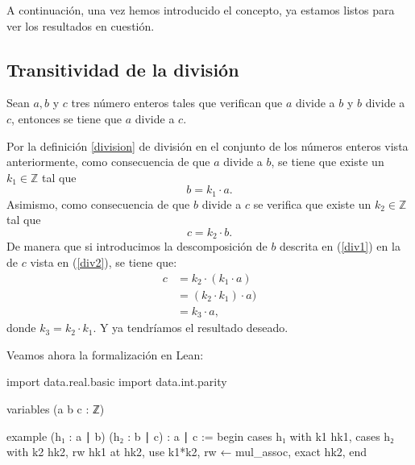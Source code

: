 A continuación, una vez hemos introducido el concepto, ya estamos listos
para ver los resultados en cuestión.

\subsection{Transitividad de la división}

\begin{teorema}
  Sean \(a, b\) y \(c\) tres número enteros tales que verifican que
  \(a\) divide a \(b\) y \(b\) divide a \(c\), entonces se tiene que
  \(a\) divide a \(c\).
\end{teorema}

\begin{demostracion}
  Por la definición \ref{division} de división en el conjunto de los
  números enteros vista anteriormente, como consecuencia de que \(a\)
  divide a \(b\), se tiene que existe un \(k_1 ∈ ℤ\) tal que
  \begin{equation}\label{div1}
    b = k_1 · a.
  \end{equation}
  Asimismo, como consecuencia de que \(b\) divide a \(c\) se verifica
  que existe un \(k_2 ∈ ℤ\) tal que
  \begin{equation}\label{div2}
    c = k_2 · b.
  \end{equation}
  De manera que si introducimos la descomposición de \(b\) descrita en
  (\ref{div1}) en la de \(c\) vista en (\ref{div2}), se tiene que:
  \[\begin{array}{ll}
      c & = k_2 · (k_1  · a) \\
        & = (k_2 · k_1)  · a) \\
        & = k_3 · a,
    \end{array}\]
  donde \(k_3 = k_2 · k _1\). Y ya tendríamos el resultado deseado.
\end{demostracion}

Veamos ahora la formalización en Lean:
\begin{leancode}
import data.real.basic
import data.int.parity

variables (a b c : ℤ)

example (h₁ : a ∣ b) (h₂ : b ∣ c) : a ∣ c :=
begin
  cases h₁ with k1 hk1,
  cases h₂ with k2 hk2,
  rw hk1 at hk2,
  use k1*k2,
  rw ← mul_assoc,
exact hk2,
end
\end{leancode}


